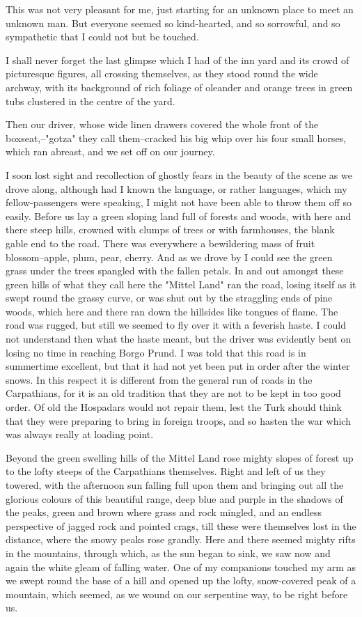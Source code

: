 This was not very pleasant for me, just starting for an unknown place to meet an unknown man. But everyone seemed so kind-hearted, and so sorrowful, and so sympathetic that I could not but be touched. 

I shall never forget the last glimpse which I had of the inn yard and its crowd of picturesque figures, all crossing themselves, as they stood round the wide archway, with its background of rich foliage of oleander and orange trees in green tubs clustered in the centre of the yard. 

Then our driver, whose wide linen drawers covered the whole front of the boxseat,--"gotza" they call them--cracked his big whip over his four small horses, which ran abreast, and we set off on our journey. 

I soon lost sight and recollection of ghostly fears in the beauty of the scene as we drove along, although had I known the language, or rather languages, which my fellow-passengers were speaking, I might not have been able to throw them off so easily. Before us lay a green sloping land full of forests and woods, with here and there steep hills, crowned with clumps of trees or with farmhouses, the blank gable end to the road. There was everywhere a bewildering mass of fruit blossom--apple, plum, pear, cherry. And as we drove by I could see the green grass under the trees spangled with the fallen petals. In and out amongst these green hills of what they call here the "Mittel Land" ran the road, losing itself as it swept round the grassy curve, or was shut out by the straggling ends of pine woods, which here and there ran down the hillsides like tongues of flame. The road was rugged, but still we seemed to fly over it with a feverish haste. I could not understand then what the haste meant, but the driver was evidently bent on losing no time in reaching Borgo Prund. I was told that this road is in summertime excellent, but that it had not yet been put in order after the winter snows. In this respect it is different from the general run of roads in the Carpathians, for it is an old tradition that they are not to be kept in too good order. Of old the Hospadars would not repair them, lest the Turk should think that they were preparing to bring in foreign troops, and so hasten the war which was always really at loading point. 

Beyond the green swelling hills of the Mittel Land rose mighty slopes of forest up to the lofty steeps of the Carpathians themselves. Right and left of us they towered, with the afternoon sun falling full upon them and bringing out all the glorious colours of this beautiful range, deep blue and purple in the shadows of the peaks, green and brown where grass and rock mingled, and an endless perspective of jagged rock and pointed crags, till these were themselves lost in the distance, where the snowy peaks rose grandly. Here and there seemed mighty rifts in the mountains, through which, as the sun began to sink, we saw now and again the white gleam of falling water. One of my companions touched my arm as we swept round the base of a hill and opened up the lofty, snow-covered peak of a mountain, which seemed, as we wound on our serpentine way, to be right before us. 


